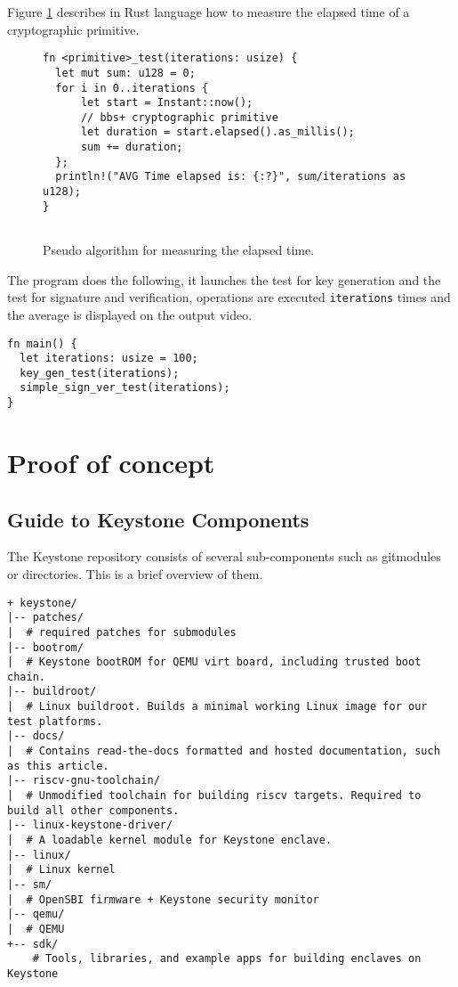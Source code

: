 Figure \ref{bbs-pseudo-algo} describes in Rust language how to measure the elapsed time of a cryptographic primitive. \\
\begin{figure}[H]
\begin{lstlisting}[frame=single]
fn <primitive>_test(iterations: usize) {
  let mut sum: u128 = 0;
  for i in 0..iterations {
      let start = Instant::now();
      // bbs+ cryptographic primitive
      let duration = start.elapsed().as_millis();
      sum += duration;
  };
  println!("AVG Time elapsed is: {:?}", sum/iterations as u128);
}
    
\end{lstlisting}
\caption{Pseudo algorithm for measuring the elapsed time.}
\label{bbs-pseudo-algo}
\end{figure}
The program does the following, it launches the test for key generation and the test for signature and verification, operations are executed \texttt{iterations} times and the average is displayed on the output video.  \\
\begin{lstlisting}[frame=single]
fn main() {
  let iterations: usize = 100;
  key_gen_test(iterations);
  simple_sign_ver_test(iterations);
}
\end{lstlisting}



\section{Proof of concept}
\subsection{Guide to Keystone Components}
The Keystone repository consists of several sub-components such as gitmodules or directories. This is a brief overview of them. \\
\begin{lstlisting}[frame=single]
+ keystone/
|-- patches/
|  # required patches for submodules
|-- bootrom/
|  # Keystone bootROM for QEMU virt board, including trusted boot chain.
|-- buildroot/
|  # Linux buildroot. Builds a minimal working Linux image for our test platforms.
|-- docs/
|  # Contains read-the-docs formatted and hosted documentation, such as this article.
|-- riscv-gnu-toolchain/
|  # Unmodified toolchain for building riscv targets. Required to build all other components.
|-- linux-keystone-driver/
|  # A loadable kernel module for Keystone enclave.
|-- linux/
|  # Linux kernel
|-- sm/
|  # OpenSBI firmware + Keystone security monitor
|-- qemu/
|  # QEMU
+-- sdk/
    # Tools, libraries, and example apps for building enclaves on Keystone        
\end{lstlisting}

